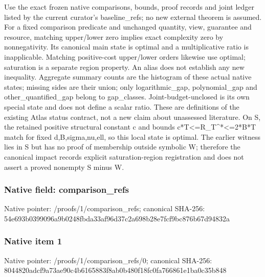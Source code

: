 \documentclass[10pt,a4paper]{article}
\begin{document}
\begingroup\raggedright\sloppy Use the exact frozen native comparisons,\allowbreak{} bounds,\allowbreak{} proof records and joint ledger listed by the current curator's baseline\_\allowbreak{}refs;\allowbreak{} no new external theorem is assumed. For a fixed comparison predicate and unchanged quantity,\allowbreak{} view,\allowbreak{} guarantee and resource,\allowbreak{} matching upper/\allowbreak{}lower zero implies exact complexity zero by nonnegativity. Its canonical main state is optimal and a multiplicative ratio is inapplicable. Matching positive-cost upper/\allowbreak{}lower orders likewise use optimal;\allowbreak{} saturation is a separate region property. An alias does not establish any new inequality. Aggregate summary counts are the histogram of these actual native states;\allowbreak{} missing sides are their union;\allowbreak{} only logarithmic\_\allowbreak{}gap,\allowbreak{} polynomial\_\allowbreak{}gap and other\_\allowbreak{}quantified\_\allowbreak{}gap belong to gap\_\allowbreak{}classes. Joint-budget-unclosed is its own special state and does not define a scalar ratio. These are definitions of the existing Atlas status contract,\allowbreak{} not a new claim about unassessed literature. On S,\allowbreak{} the retained positive structural constant c and bounds c*T<=\allowbreak{}R\_\allowbreak{}T\textasciicircum{}*<=\allowbreak{}2*B*T match for fixed d,\allowbreak{}B,\allowbreak{}sigma,\allowbreak{}nu,\allowbreak{}ell,\allowbreak{} so this local state is optimal. The earlier witness lies in S but has no proof of membership outside symbolic W;\allowbreak{} therefore the canonical impact records explicit saturation-region registration and does not assert a proved nonempty S minus W. \par\endgroup

\subsubsection{Native field: comparison\_\allowbreak{}refs}
Native pointer: /proofs/1/comparison\_\allowbreak{}refs; canonical SHA-256: 54e693b0399096a9b0248fbda33af96d37c2a698b28e7fcf9bc876b67d94832a

\subsubsection{Native item 1}
Native pointer: /proofs/1/comparison\_\allowbreak{}refs/0; canonical SHA-256: 8044820adcf9a73ae90c4b6165883f8ab0b480f18fc0fa766861e1ba0c35b848
\end{document}
